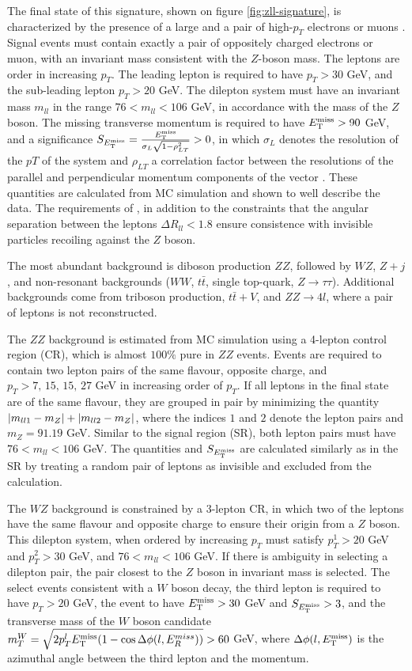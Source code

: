 The final state of this signature, shown on figure \ref{fig:zll-signature}, is characterized by the presence of a large \met and a pair of high-$p_T$ electrons or muons \cite{HIGG-2018-26}. Signal events must contain exactly a pair of oppositely charged electrons or muon, with an invariant mass consistent with the $Z$-boson mass. The leptons are order in increasing $p_T$. The leading lepton is required to have $p_T > 30$ GeV, and the sub-leading lepton $p_T>20$ GeV. The dilepton system must have an invariant mass $m_{ll}$ in the range $76 < m_{ll} < 106$ GeV, in accordance with the mass of the $Z$ boson. The missing transverse momentum is required to have $E_{\mathrm{T}}^{\mathrm{miss}}>90$ GeV, and a \met significance $S_{E_{\mathrm{T}}^{\mathrm{miss}}}=\frac{E_{\mathrm{T}}^{\mathrm{miss}}}{\sigma_L\sqrt{1-\rho_{LT}^2}}>0$, in which $\sigma_L$ denotes the resolution of the $pT$ of the system and $\rho_{LT}$ a correlation factor between the resolutions of the parallel and perpendicular momentum components of the \met vector \cite{ATLAS-CONF-2018-038}. These quantities are calculated from MC simulation and shown to well describe the data. The requirements of \met, in addition to the constraints that the angular separation between the leptons $\Delta R_{ll}<1.8$ ensure consistence with invisible particles recoiling against the $Z$ boson. 

The most abundant background is diboson production $ZZ$, followed by $WZ$, $Z+j$, and non-resonant backgrounds ($WW$, $t\bar{t}$, single top-quark, $Z\rightarrow\tau\tau$). Additional backgrounds come from triboson production, $t\bar{t}+V$, and $ZZ\rightarrow 4l$, where a pair of leptons is not reconstructed. 

The $ZZ$ background is estimated from MC simulation using a 4-lepton control region (CR), which is almost $100\%$ pure in $ZZ$ events. Events are required to contain two lepton pairs of the same flavour, opposite charge, and $p_T>7,\,15,\,15,\,27$ GeV in increasing order of $p_T$. If all  leptons in the final state are of the same flavour, they are grouped in pair by minimizing the quantity $\abs{m_{ll1} - m_Z} + \abs{m_{ll2} - m_Z}$, where the indices $1$ and $2$ denote the lepton pairs and $m_Z=91.19$ GeV. Similar to the signal region (SR), both lepton pairs must have $76<m_{ll} < 106$ GeV. The quantities \met and $S_{E_{\mathrm{T}}^{\mathrm{miss}}}$ are calculated similarly as in the SR by treating a random pair of leptons as invisible and excluded from the calculation.

The $WZ$ background is constrained by a 3-lepton CR, in which two of the leptons have the same flavour and opposite charge to ensure their origin from a $Z$ boson. This dilepton system, when ordered by increasing $p_T$ must satisfy $p_{T}^1>20$ GeV and $p_{T}^2>30$ GeV, and $76< m_{ll}< 106$ GeV. If there is ambiguity in selecting a dilepton pair, the pair closest to the $Z$ boson in invariant mass is selected. The select events consistent with a $W$ boson decay, the third lepton is required to have $p_T>20$ GeV, the event to have $E_{\mathrm{T}}^{\mathrm{miss}}>30$ GeV and $S_{E_{\mathrm{T}}^{\mathrm{miss}}}>3$, and the transverse mass of the $W$ boson candidate $m_T^W=\sqrt{2p_T^lE_{\mathrm{T}}^{\mathrm{miss}}(1-\cos\Delta\phi(l,E_R^{miss}))} > 60$ GeV, where $\Delta\phi(l, E_{\mathrm{T}}^{\mathrm{miss}})$ is the azimuthal angle between the third lepton and the \met momentum. 

